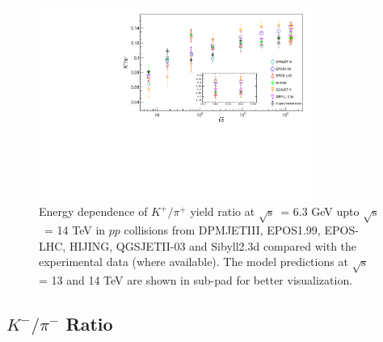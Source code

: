 \documentclass{article}
\newcommand{\sqrts}{\mbox{$\sqrt{\mathrm{s}}$}}
\begin{document}
\begin{figure}[ht!]
\begin{center}
\includegraphics[width=0.8\textwidth]{new_k+_pi+.pdf}
\caption{ Energy dependence of $K^+/\pi^+$ yield ratio at \sqrts~= 6.3 GeV upto \sqrts~= 14 TeV in $pp$ collisions from DPMJETIII, EPOS1.99, EPOS-LHC, HIJING, QGSJETII-03 and Sibyll2.3d compared with the experimental data (where available). The model predictions at \sqrts~ = 13 and 14 TeV are shown in sub-pad for better visualization.}
\label{fig1}
\end{center}
\end{figure}



\subsection{$K^-/\pi^-$ Ratio}\label{subsec1}
\end{document}

